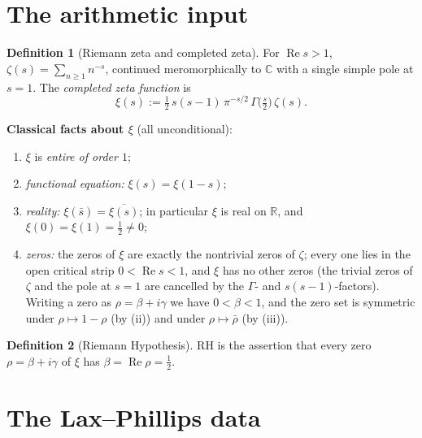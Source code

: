 \documentclass[11pt]{amsart}
\theoremstyle{plain}
\theoremstyle{definition}
\newtheorem{definition}{Definition}
\theoremstyle{remark}
\newcommand{\C}{\mathbb{C}}
\newcommand{\R}{\mathbb{R}}
\renewcommand{\Re}{\operatorname{Re}}
\begin{document}
\section{The arithmetic input}

\begin{definition}[Riemann zeta and completed zeta]\label{def:zeta}
For $\Re s>1$, $\zeta(s)=\sum_{n\ge1}n^{-s}$, continued meromorphically to $\C$ with a
single simple pole at $s=1$. The \emph{completed zeta function} is
\[
  \xi(s):=\tfrac12\,s(s-1)\,\pi^{-s/2}\,\Gamma\!\bigl(\tfrac s2\bigr)\,\zeta(s).
\]
\end{definition}

\noindent\textbf{Classical facts about $\xi$} (all unconditional):
\begin{enumerate}[label=(\roman*),leftmargin=2.2em]
  \item $\xi$ is \emph{entire of order $1$};
  \item \emph{functional equation:} $\xi(s)=\xi(1-s)$;
  \item \emph{reality:} $\xi(\bar s)=\overline{\xi(s)}$; in particular $\xi$ is real on
        $\R$, and $\xi(0)=\xi(1)=\tfrac12\neq0$;
  \item \emph{zeros:} the zeros of $\xi$ are exactly the nontrivial zeros of $\zeta$;
        every one lies in the open critical strip $0<\Re s<1$, and $\xi$ has no other
        zeros (the trivial zeros of $\zeta$ and the pole at $s=1$ are cancelled by the
        $\Gamma$- and $s(s-1)$-factors). Writing a zero as $\rho=\beta+i\gamma$ we have
        $0<\beta<1$, and the zero set is symmetric under $\rho\mapsto1-\rho$ (by (ii))
        and under $\rho\mapsto\bar\rho$ (by (iii)).
\end{enumerate}

\begin{definition}[Riemann Hypothesis]\label{def:rh}
$\mathrm{RH}$ is the assertion that every zero $\rho=\beta+i\gamma$ of $\xi$ has
$\beta=\Re\rho=\tfrac12$.
\end{definition}

\section{The Lax--Phillips data}
\end{document}
